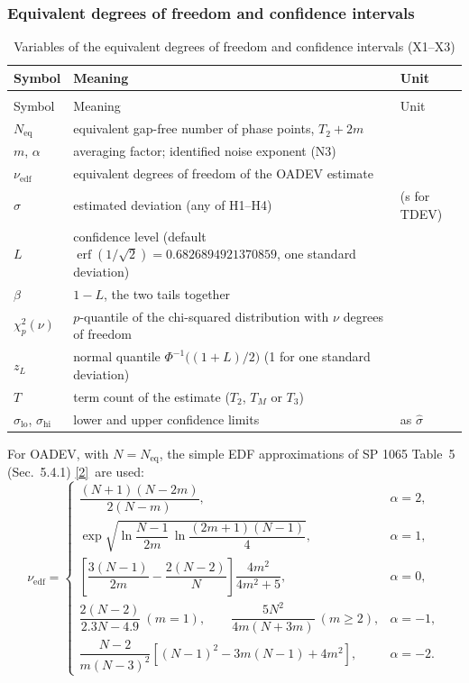 \documentclass[11pt,a4paper]{article}
\makeatletter
\newcommand{\nist}{\href{https://tf.nist.gov/general/pdf/2220.pdf}{[2]}}
\renewcommand{\_}{\usscore\allowbreak}
\newenvironment{vartable}[2]{%
 \par\small\setlength{\LTpre}{3pt}\setlength{\LTpost}{3pt}%
 \begin{longtable}{@{}>{\raggedright}p{.2\linewidth}>{\raggedright}p{.57\linewidth}>{\raggedright\arraybackslash}p{.17\linewidth}@{}}
 \caption{#2}\label{#1}\\
 \toprule Symbol & Meaning & Unit\\\midrule
 \endfirsthead
 \multicolumn{3}{@{}l}{\footnotesize\itshape Table \thetable{} (continued)}\\
 \toprule Symbol & Meaning & Unit\\\midrule
 \endhead
 \bottomrule
 \endlastfoot}
 {\end{longtable}\normalsize}
\makeatother
\begin{document}
\subsubsection{Equivalent degrees of freedom and confidence intervals}
\begin{vartable}{tab:var-X}{Variables of the equivalent degrees of freedom and confidence intervals (X1--X3)}
\(N_{\mathrm{eq}}\) & equivalent gap-free number of phase points, \(T_2+2m\) & 1\\
\(m\), \(\alpha\) & averaging factor; identified noise exponent (N3) & 1\\
\(\nu_{\mathrm{edf}}\) & equivalent degrees of freedom of the OADEV estimate & 1\\
\(\hat\sigma\) & estimated deviation (any of H1--H4) & 1 (s for TDEV)\\
\(L\) & confidence level (default \(\operatorname{erf}(1/\sqrt2)=0.6826894921370859\), one standard deviation) & 1\\
\(\beta\) & \(1-L\), the two tails together & 1\\
\(\chi^2_p(\nu)\) & \(p\)-quantile of the chi-squared distribution with \(\nu\) degrees of freedom & 1\\
\(z_L\) & normal quantile \(\Phi^{-1}\bigl((1+L)/2\bigr)\) (1 for one standard deviation) & 1\\
\(T\) & term count of the estimate (\(T_2\), \(T_M\) or \(T_3\)) & 1\\
\(\sigma_{\mathrm{lo}}\), \(\sigma_{\mathrm{hi}}\) & lower and upper confidence limits & as \(\hat\sigma\)\\
\end{vartable}
For OADEV, with \(N=N_{\mathrm{eq}}\), the simple EDF approximations of SP 1065 Table~5 (Sec.~5.4.1)
\nist\ are used:
\begin{equation}
\nu_{\mathrm{edf}}=\begin{cases}
\dfrac{(N+1)(N-2m)}{2(N-m)}, & \alpha=2,\\[8pt]
\exp\sqrt{\ln\dfrac{N-1}{2m}\,\ln\dfrac{(2m+1)(N-1)}{4}}, & \alpha=1,\\[8pt]
\left[\dfrac{3(N-1)}{2m}-\dfrac{2(N-2)}{N}\right]\dfrac{4m^2}{4m^2+5}, & \alpha=0,\\[8pt]
\dfrac{2(N-2)}{2.3N-4.9}\ (m=1),\qquad \dfrac{5N^2}{4m(N+3m)}\ (m\ge2), & \alpha=-1,\\[8pt]
\dfrac{N-2}{m(N-3)^2}\left[(N-1)^2-3m(N-1)+4m^2\right], & \alpha=-2.
\end{cases} \tag{X1}\label{eq:X1}
\end{equation}
\end{document}
